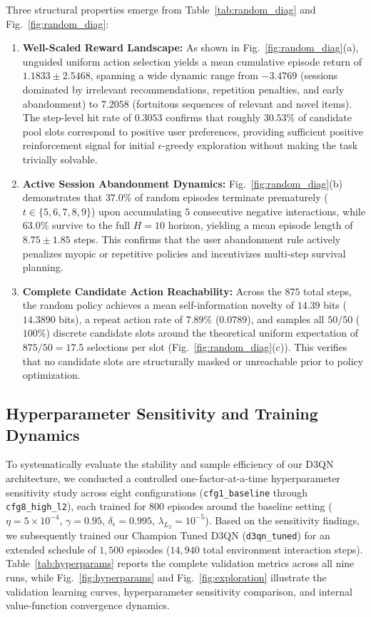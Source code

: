Three structural properties emerge from Table~\ref{tab:random_diag} and Fig.~\ref{fig:random_diag}:
\begin{enumerate}
    \item \textbf{Well-Scaled Reward Landscape:} As shown in Fig.~\ref{fig:random_diag}(a), unguided uniform action selection yields a mean cumulative episode return of $1.1833 \pm 2.5468$, spanning a wide dynamic range from $-3.4769$ (sessions dominated by irrelevant recommendations, repetition penalties, and early abandonment) to $7.2058$ (fortuitous sequences of relevant and novel items). The step-level hit rate of $0.3053$ confirms that roughly $30.53\%$ of candidate pool slots correspond to positive user preferences, providing sufficient positive reinforcement signal for initial $\epsilon$-greedy exploration without making the task trivially solvable.
    \item \textbf{Active Session Abandonment Dynamics:} Fig.~\ref{fig:random_diag}(b) demonstrates that $37.0\%$ of random episodes terminate prematurely ($t \in \{5, 6, 7, 8, 9\}$) upon accumulating $5$ consecutive negative interactions, while $63.0\%$ survive to the full $H=10$ horizon, yielding a mean episode length of $8.75 \pm 1.85$ steps. This confirms that the user abandonment rule actively penalizes myopic or repetitive policies and incentivizes multi-step survival planning.
    \item \textbf{Complete Candidate Action Reachability:} Across the $875$ total steps, the random policy achieves a mean self-information novelty of $14.39$ bits ($14.3890$ bits), a repeat action rate of $7.89\%$ ($0.0789$), and samples all $50/50$ ($100\%$) discrete candidate slots around the theoretical uniform expectation of $875 / 50 = 17.5$ selections per slot (Fig.~\ref{fig:random_diag}(c)). This verifies that no candidate slots are structurally masked or unreachable prior to policy optimization.
\end{enumerate}

\subsection{Hyperparameter Sensitivity and Training Dynamics}
\label{subsec:hyperparam}

To systematically evaluate the stability and sample efficiency of our D3QN architecture, we conducted a controlled one-factor-at-a-time hyperparameter sensitivity study across eight configurations (\texttt{cfg1\_baseline} through \texttt{cfg8\_high\_l2}), each trained for $800$ episodes around the baseline setting ($\eta = 5 \times 10^{-4}$, $\gamma = 0.95$, $\delta_\epsilon = 0.995$, $\lambda_{L_2} = 10^{-5}$). Based on the sensitivity findings, we subsequently trained our Champion Tuned D3QN (\texttt{d3qn\_tuned}) for an extended schedule of $1{,}500$ episodes ($14{,}940$ total environment interaction steps). Table~\ref{tab:hyperparams} reports the complete validation metrics across all nine runs, while Fig.~\ref{fig:hyperparams} and Fig.~\ref{fig:exploration} illustrate the validation learning curves, hyperparameter sensitivity comparison, and internal value-function convergence dynamics.

